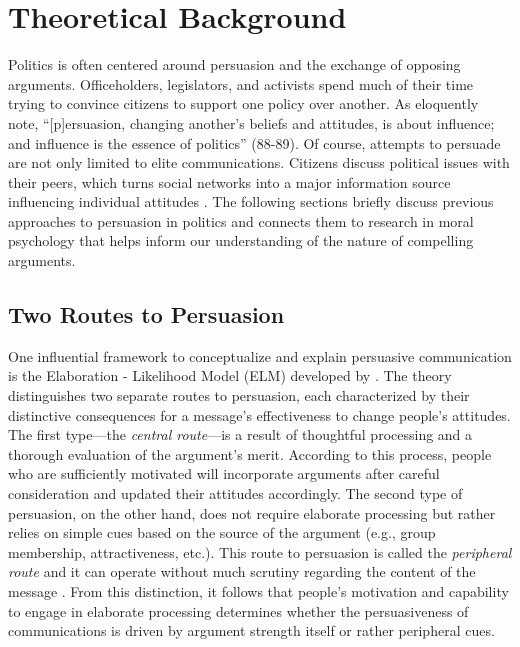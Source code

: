 


\section{Theoretical Background}

Politics is often centered around persuasion and the exchange of opposing arguments. Officeholders, legislators, and activists spend much of their time trying to convince citizens to support one policy over another. As \citet{cobb1997changing} eloquently note, ``[p]ersuasion, changing another's beliefs and attitudes, is about influence; and influence is the essence of politics'' (88-89). Of course, attempts to persuade are not only limited to elite communications. Citizens discuss political issues with their peers, which turns social networks into a major information source influencing individual attitudes \citep[e.g.,][]{huckfeldt1995political,ahn2010communication,lazer2010coevolution}. The following sections briefly discuss previous approaches to persuasion in politics and connects them to research in moral psychology that helps inform our understanding of the nature of compelling arguments.



\subsection{Two Routes to Persuasion}

One influential framework to conceptualize and explain persuasive communication is the Elaboration - Likelihood Model (ELM) developed by \citet{petty1986communication,petty1986elaboration}. The theory distinguishes two separate routes to persuasion, each characterized by their distinctive consequences for a message's effectiveness to change people's attitudes. The first type---the \textit{central route}---is a result of thoughtful processing and a thorough evaluation of the argument's merit. According to this process, people who are sufficiently motivated will incorporate arguments after careful consideration and updated their attitudes accordingly. The second type of persuasion, on the other hand, does not require elaborate processing but rather relies on simple cues based on the source of the argument (e.g., group membership, attractiveness, etc.). This route to persuasion is called the \textit{peripheral route} and it can operate without much scrutiny regarding the content of the message \citep[see also][for a similar distinction between systematic and heuristic processing]{chaiken1989heuristic}. From this distinction, it follows that people's motivation and capability to engage in elaborate processing determines whether the persuasiveness of communications is driven by argument strength itself or rather peripheral cues.

